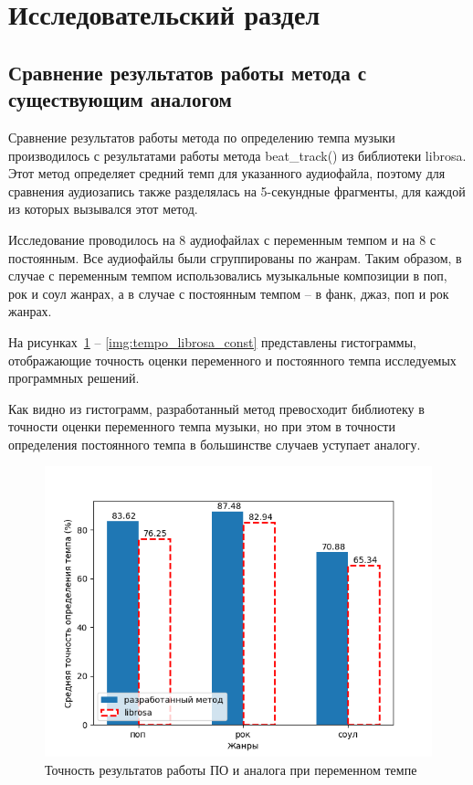 \section{Исследовательский раздел}
\setcounter{figure}{0}
\setcounter{table}{0}
\subsection{Сравнение результатов работы метода с существующим аналогом}

Сравнение результатов работы метода по определению темпа музыки производилось с результатами работы метода beat\_track() из библиотеки librosa. Этот метод определяет средний темп для указанного аудиофайла, поэтому для сравнения аудиозапись также разделялась на 5-секундные фрагменты, для каждой из которых вызывался этот метод.

Исследование проводилось на 8 аудиофайлах с переменным темпом и на 8 с постоянным. Все аудиофайлы были сгруппированы по жанрам. Таким образом, в случае с переменным темпом использовались музыкальные композиции в поп, рок и соул жанрах, а в случае с постоянным темпом -- в фанк, джаз, поп и рок жанрах.

На рисунках~\ref{img:tempo_librosa_change} -- \ref{img:tempo_librosa_const} представлены гистограммы, отображающие точность оценки переменного и постоянного темпа исследуемых программных решений.

Как видно из гистограмм, разработанный метод превосходит библиотеку в точности оценки переменного темпа музыки, но при этом в точности определения постоянного темпа в большинстве случаев уступает аналогу.

\begin{figure}[h]
	\centering
	\includegraphics[scale=0.9]{../graphs/changing_tempo_librosa.png}
	\caption{Точность результатов работы ПО и аналога при переменном темпе}
	\label{img:tempo_librosa_change}
\end{figure}

